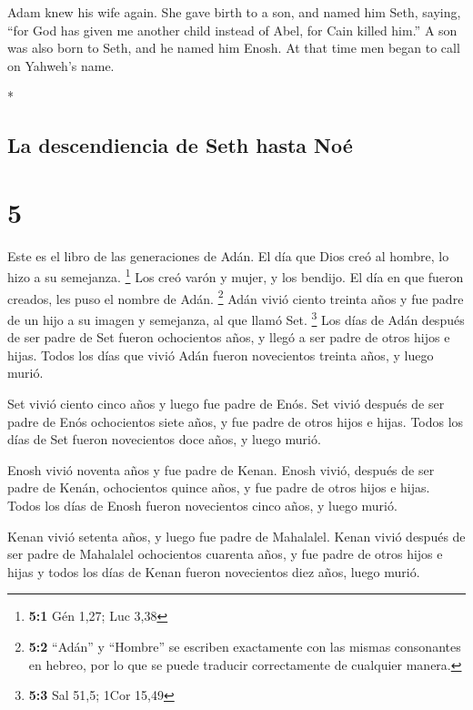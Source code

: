 \begin{paracol}{2}
\begin{otherlanguage}{english}
 Adam knew his wife again. She gave birth to a son, and
named him Seth, saying, ``for God has given me another child instead of
Abel, for Cain killed him.''  A son was also born to
Seth, and he named him Enosh. At that time men began to call on Yahweh's
name.

\end{otherlanguage}

\switchcolumn[0]*

\hypertarget{la-descendiencia-de-seth-hasta-nouxe9}{%
\subsection{La descendiencia de Seth hasta
Noé}\label{la-descendiencia-de-seth-hasta-nouxe9}}

\hypertarget{section-8}{%
\section{5}\label{section-8}}

 Este es el libro de las generaciones de Adán. El día que
Dios creó al hombre, lo hizo a su semejanza. \footnote{\textbf{5:1} Gén
  1,27; Luc 3,38}  Los creó varón y mujer, y los bendijo.
El día en que fueron creados, les puso el nombre de Adán. \footnote{\textbf{5:2}
  ``Adán'' y ``Hombre'' se escriben exactamente con las mismas
  consonantes en hebreo, por lo que se puede traducir correctamente de
  cualquier manera.}  Adán vivió ciento treinta años y fue
padre de un hijo a su imagen y semejanza, al que llamó Set. \footnote{\textbf{5:3}
  Sal 51,5; 1Cor 15,49}  Los días de Adán después de ser
padre de Set fueron ochocientos años, y llegó a ser padre de otros hijos
e hijas.  Todos los días que vivió Adán fueron novecientos
treinta años, y luego murió.

 Set vivió ciento cinco años y luego fue padre de Enós.
 Set vivió después de ser padre de Enós ochocientos siete
años, y fue padre de otros hijos e hijas.  Todos los días
de Set fueron novecientos doce años, y luego murió.

 Enosh vivió noventa años y fue padre de Kenan.
 Enosh vivió, después de ser padre de Kenán, ochocientos
quince años, y fue padre de otros hijos e hijas.  Todos
los días de Enosh fueron novecientos cinco años, y luego murió.

 Kenan vivió setenta años, y luego fue padre de
Mahalalel.  Kenan vivió después de ser padre de Mahalalel
ochocientos cuarenta años, y fue padre de otros hijos e hijas
 y todos los días de Kenan fueron novecientos diez años,
luego murió.


\end{paracol}
